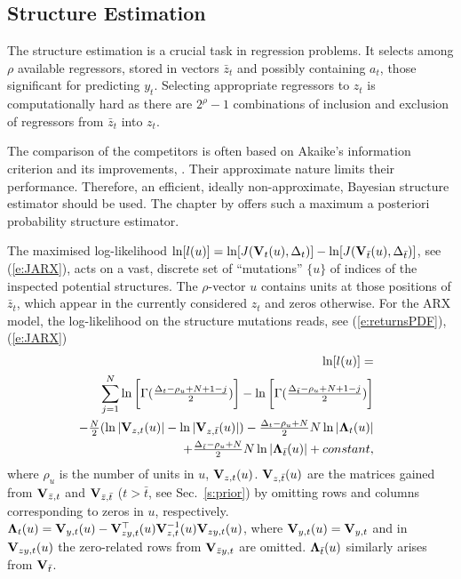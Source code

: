\subsection{Structure Estimation} \label{s:SE}
 The structure estimation is a crucial task in regression problems. It selects among
$\rho$ available regressors, stored in vectors $\bar{z}_{t}$ and possibly containing $a_{t}$, those significant for predicting $y_{t}$.  Selecting appropriate regressors to $z_{t}$ is computationally hard as there are $2^{\rho}-1$ combinations of inclusion and exclusion of regressors from $\bar{z}_{t}$ into $z_{t}$.

The comparison of the competitors is often based on Akaike's information criterion and its improvements, \cite{CavNea:19}. Their approximate nature limits their performance. Therefore, an efficient, ideally non-approximate, Bayesian structure estimator should be used. The chapter by \cite{KarKul:88} offers such a maximum a posteriori probability structure estimator.

The maximised log-likelihood $\ln[l(u)]=\ln[J(\mathbf{V}_{t}(u),\Delta_{t})]-\ln[J(\mathbf{V}_{\bar{t}}(u),\Delta_{\bar{t}})]$, see (\ref{e:JARX}), acts on a vast, discrete set of ``mutations'' $\{u\}$ of indices of the inspected potential structures. The $\rho$-vector $u$ contains units at those positions
of $\bar{z}_{t}$, which appear in the currently considered $z_{t}$ and zeros otherwise. For the ARX model, the log-likelihood on the structure mutations reads, see (\ref{e:returnsPDF}), (\ref{e:JARX})
\begin{eqnarray}
      \nonumber
   &&\hspace*{-4ex}\ln[l(u)]=\\
   \nonumber
   &&
   \sum_{j=1}^{N} \ln\bigg[\Gamma\scalebox{1}{$(\frac{\Delta_{t}-\rho_{u}+N+1-j}{2})$}\bigg] - \ln\bigg[\Gamma\scalebox{1}{$(\frac{\Delta_{\bar{t}}-\rho_{u}+N+1-j}{2})$}\bigg] \\
    \nonumber
    &&\hspace*{-4ex}-\scalebox{1}{$\frac{N}{2}(\ln|\mat{V}_{z,t}(u)|$}-\ln|\mat{V}_{z,\bar{t}}(u)|)-\scalebox{1}{$\frac{\Delta_{t}-\rho_{u} + N}{2}N\ln|\mat{\Lambda}_{t}(u)|$}\\
    \label{e:loglikelihoodk}
    &&\hspace*{-4ex} + \scalebox{1}{$\frac{\Delta_{\bar{t}}-\rho_{u} + N}{2}N\ln|\mat{\Lambda}_{\bar{t}}(u)|$}+constant,
     \end{eqnarray}
 where $\rho_{u}$ is the number of units in $u$, $\mathbf{V}_{z,t}(u)$. $\mathbf{V}_{z,\bar{t}}(u)$ are the matrices gained from $\mathbf{V}_{\bar{z},t}$ and
 $\mathbf{V}_{\bar{z},\bar{t}}$ ($t>\bar{t}$, see Sec.\ \ref{s:prior})  by omitting rows and columns corresponding to zeros in $u$, respectively. $\mathbf{\Lambda}_{t}(u)=\mathbf{V}_{y,t}(u) - \mathbf{V}^{\top}_{zy,t}(u)\mathbf{V}^{-1}_{z,t}(u)\mathbf{V}_{zy,t}(u)$, where $\mathbf{V}_{y,t}(u)=\mathbf{V}_{y,t}$ and in $\mathbf{V}_{zy,t}(u)$ the zero-related rows from  $\mathbf{V}_{\bar{z}y,t}$ are omitted. $\mathbf{\Lambda}_{\bar{t}}(u)$ similarly arises from $\mathbf{V}_{\bar{t}}$.

